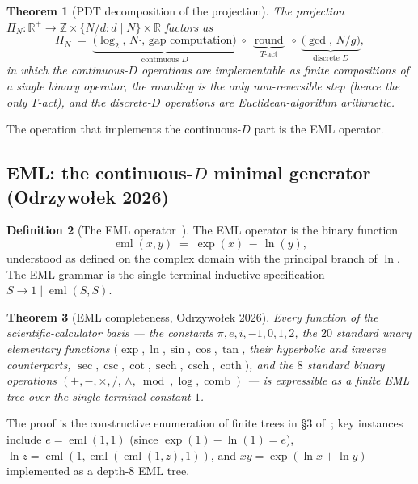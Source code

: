 \documentclass[11pt,a4paper]{article}
\newtheorem{theorem}{Theorem}[section]
\theoremstyle{definition}
\newtheorem{definition}[theorem]{Definition}
\theoremstyle{remark}
\newcommand{\R}{\mathbb{R}}
\newcommand{\Z}{\mathbb{Z}}
\DeclareMathOperator{\round}{round}
\begin{document}
\begin{theorem}[PDT decomposition of the projection]\label{thm:pdt-decomp}
The projection $\Pi_{N}:\R^{+}\to\Z\times\{N/d : d\mid N\}\times\R$ factors as
\[
\Pi_{N} \;=\; \underbrace{\bigl(\log_{2},\, N\cdot,\, \text{gap computation}\bigr)}_{\text{continuous $D$}} \;\circ\; \underbrace{\round}_{T\text{-act}} \;\circ\; \underbrace{\bigl(\gcd,\, N/g\bigr)}_{\text{discrete $D$}},
\]
in which the continuous-$D$ operations are implementable as finite compositions of a single binary operator, the rounding is the only non-reversible step (hence the only $T$-act), and the discrete-$D$ operations are Euclidean-algorithm arithmetic.
\end{theorem}

The operation that implements the continuous-$D$ part is the EML operator.

\subsection{EML: the continuous-$D$ minimal generator (Odrzywołek 2026)}\label{subsec:eml}

\begin{definition}[The EML operator~\cite{Odrzywolek2026}]\label{def:eml}
The EML operator is the binary function
\[
\operatorname{eml}(x,y) \;=\; \exp(x)\,-\,\ln(y),
\]
understood as defined on the complex domain with the principal branch of $\ln$. The EML grammar is the single-terminal inductive specification $S\to 1 \mid \operatorname{eml}(S,S)$.
\end{definition}

\begin{theorem}[EML completeness, Odrzywołek 2026]\label{thm:eml-complete}
Every function of the scientific-calculator basis --- the constants $\pi,e,i,-1,0,1,2$, the $20$ standard unary elementary functions $(\exp,\ln,\sin,\cos,\tan$, their hyperbolic and inverse counterparts, $\sec,\csc,\cot,\operatorname{sech},\operatorname{csch},\operatorname{coth})$, and the $8$ standard binary operations $(+,-,\times,/,\,\wedge,\bmod,\log,\operatorname{comb})$ --- is expressible as a finite EML tree over the single terminal constant $1$.
\end{theorem}

The proof is the constructive enumeration of finite trees in \S3 of~\cite{Odrzywolek2026}; key instances include $e = \operatorname{eml}(1,1)$ (since $\exp(1)-\ln(1)=e$), $\ln z = \operatorname{eml}(1,\operatorname{eml}(\operatorname{eml}(1,z),1))$, and $xy = \exp(\ln x + \ln y)$ implemented as a depth-$8$ EML tree.
\end{document}
